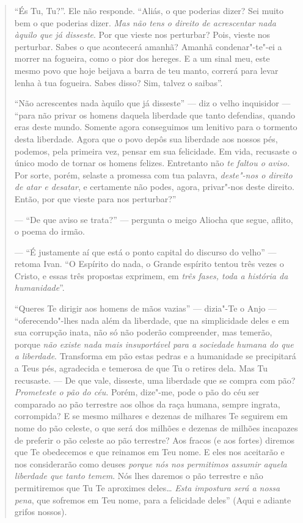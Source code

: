 \begin{quote}
``És Tu, Tu?''. Ele não responde. ``Aliás, o que poderias dizer? Sei
muito bem o que poderias dizer. \emph{Mas não tens o direito de
acrescentar nada àquilo que já disseste}. Por que vieste nos perturbar?
Pois, vieste nos perturbar. Sabes o que acontecerá amanhã? Amanhã
condenar"-te"-ei a morrer na fogueira, como o pior dos hereges. E a um
sinal meu, este mesmo povo que hoje beijava a barra de teu manto,
correrá para levar lenha à tua fogueira. Sabes disso? Sim, talvez o
saibas''.

``Não acrescentes nada àquilo que já disseste'' --- diz o velho
inquisidor --- ``para não privar os homens daquela liberdade que tanto
defendias, quando eras deste mundo. Somente agora conseguimos um
lenitivo para o tormento desta liberdade. Agora que o povo depôs sua
liberdade aos nossos pés, podemos, pela primeira vez, pensar em sua
felicidade. Em vida, recusaste o único modo de tornar os homens felizes.
Entretanto não \emph{te faltou o aviso.} Por sorte, porém, selaste a
promessa com tua palavra, \emph{deste"-nos o direito de atar e
desatar}, e certamente não podes, agora, privar"-nos deste direito.
Então, por que vieste para nos perturbar?''

--- ``De que aviso se trata?'' --- pergunta o meigo Aliocha que segue, aflito,
o poema do irmão.

--- ``É justamente aí que está o ponto capital do discurso do velho'' ---
retoma Ivan. ``O Espírito do nada, o Grande espírito tentou três vezes o
Cristo, e essas três propostas exprimem, em \emph{três fases, toda a
história da humanidade}''.

``Queres Te dirigir aos homens de mãos vazias'' --- dizia"-Te o Anjo ---
``oferecendo"-lhes nada além da liberdade, que na simplicidade deles e em
sua corrupção inata, não só não poderão compreender, mas temerão, porque
\emph{não existe nada mais insuportável para a sociedade humana do que
a liberdade}. Transforma em pão estas pedras e a humanidade se
precipitará a Teus pés, agradecida e temerosa de que Tu o retires dela.
Mas Tu recusaste. --- De que vale, disseste, uma liberdade que se compra
com pão? \emph{Prometeste o pão do céu}. Porém, dize"-me, pode o pão do
céu ser comparado ao pão terrestre aos olhos da raça humana, sempre
ingrata, corrompida? E se mesmo milhares e dezenas de milhares Te
seguirem em nome do pão celeste, o que será dos milhões e dezenas de
milhões incapazes de preferir o pão celeste ao pão terrestre? Aos fracos
(e aos fortes) diremos que Te obedecemos e que reinamos em Teu nome. E
eles nos aceitarão e nos considerarão como deuses \emph{porque nós nos
permitimos assumir aquela liberdade que tanto temem}. Nós lhes daremos o
pão terrestre e não permitiremos que Tu Te aproximes deles\ldots{}
\emph{Esta impostura será a nossa pena}, que sofremos em Teu nome,
para a felicidade deles'' (Aqui e adiante grifos nossos).
\end{quote}

